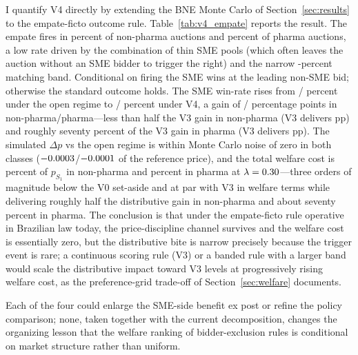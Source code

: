 I quantify V4 directly by extending the BNE Monte Carlo of Section~\ref{sec:results} to the empate-ficto outcome rule. Table~\ref{tab:v4_empate} reports the result.  The empate fires in \vFourFireRateNp{} percent of non-pharma auctions and \vFourFireRatePh{} percent of pharma auctions, a low rate driven by the combination of thin SME pools (which often leaves the auction without an SME bidder to trigger the right) and the narrow \empateBand-percent matching band. Conditional on firing the SME wins at the leading non-SME bid; otherwise the standard outcome holds. The SME win-rate rises from \vFourSmeWinSoneNp/\vFourSmeWinSonePh{} percent under the open regime to \vFourSmeWinVfourNp/\vFourSmeWinVfourPh{} percent under V4, a gain of \vFourSmeWinGainNp/\vFourSmeWinGainPh{} percentage points in non-pharma/pharma---less than half the V3 gain in non-pharma (V3 delivers \prefSmeWinGainTenNp{} pp) and roughly seventy percent of the V3 gain in pharma (V3 delivers \prefSmeWinGainTenPh{} pp). The simulated $\Delta p$ vs the open regime is within Monte Carlo noise of zero in both classes ($-0.0003$/$-0.0001$ of the reference price), and the total welfare cost is \vFourLossPctNp{} percent of $p_{S_1}$ in non-pharma and \vFourLossPctPh{} percent in pharma at $\lambda = 0.30$---three orders of magnitude below the V0 set-aside and at par with V3 in welfare terms while delivering roughly half the distributive gain in non-pharma and about seventy percent in pharma. The conclusion is that under the empate-ficto rule operative in Brazilian law today, the price-discipline channel survives and the welfare cost is essentially zero, but the distributive bite is narrow precisely because the trigger event is rare; a continuous scoring rule (V3) or a banded rule with a larger band would scale the distributive impact toward V3 levels at progressively rising welfare cost, as the preference-grid trade-off of Section~\ref{sec:welfare} documents.

Each of the four could enlarge the SME-side benefit ex post or refine the policy comparison; none, taken together with the current decomposition, changes the organizing lesson that the welfare ranking of bidder-exclusion rules is conditional on market structure rather than uniform.
